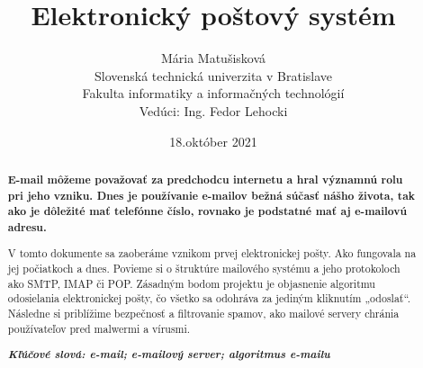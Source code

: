 \documentclass[10pt,twoside,slovak,a4paper]{article}
\title{\bf Elektronický poštový systém}
\author{Mária Matušisková\\[2pt]
	{\small Slovenská technická univerzita v Bratislave}\\
	{\small Fakulta informatiky a informačných technológií}\\
	{\small Vedúci: Ing. Fedor Lehocki}
	}
\date{\small 18.október 2021}
\begin{document}
\maketitle


\begin{abstract}
\begin{flushleft}
{\bf \hspace{0.1cm}E-mail môžeme považovať za predchodcu internetu a hral významnú rolu pri jeho vzniku. Dnes je používanie e-mailov bežná súčasť nášho života, tak ako je dôležité mať telefónne číslo, rovnako je podstatné mať aj e-mailovú adresu.\par
\vspace{0.15cm}
\hspace{0.6cm}V tomto dokumente sa zaoberáme vznikom prvej elektronickej pošty. Ako fungovala na jej počiatkoch a dnes. Povieme si o štruktúre mailového systému a jeho protokoloch ako SMTP, IMAP či POP. Zásadným bodom projektu je objasnenie algoritmu odosielania elektronickej pošty, čo všetko sa odohráva za jediným kliknutím „odoslať“. Následne si priblížime bezpečnosť a filtrovanie spamov,  ako mailové servery chránia používateľov pred malwermi a vírusmi.}\par
\vspace{.3cm}
\textbf{\textit{Kľúčové slová: e-mail; e-mailový server; algoritmus e-mailu}}
\end{flushleft}
\end{abstract}
\end{document}

